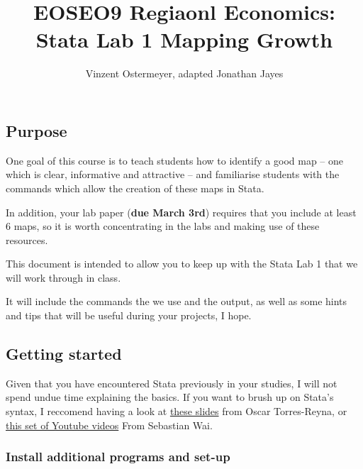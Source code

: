 \documentclass[
  letterpaper,
  DIV=11,
  numbers=noendperiod]{scrartcl}
\title{EOSEO9 Regiaonl Economics: Stata Lab 1 Mapping Growth}
\author{Vinzent Ostermeyer, adapted Jonathan Jayes}
\date{}
\renewcommand*\contentsname{Table of contents}
\newcommand\contentsname{Table of contents}
\begin{document}
\maketitle
\ifdefined\Shaded\renewenvironment{Shaded}{\begin{tcolorbox}[enhanced, interior hidden, borderline west={3pt}{0pt}{shadecolor}, boxrule=0pt, sharp corners, breakable, frame hidden]}{\end{tcolorbox}}\fi

\renewcommand*\contentsname{Table of contents}
{
\hypersetup{linkcolor=}
\setcounter{tocdepth}{3}
\tableofcontents
}
\hypertarget{purpose}{%
\subsection{Purpose}\label{purpose}}

One goal of this course is to teach students how to identify a good map
-- one which is clear, informative and attractive -- and familiarise
students with the commands which allow the creation of these maps in
Stata.

In addition, your lab paper (\textbf{due March 3rd}) requires that you
include at least 6 maps, so it is worth concentrating in the labs and
making use of these resources.

This document is intended to allow you to keep up with the Stata Lab 1
that we will work through in class.

It will include the commands the we use and the output, as well as some
hints and tips that will be useful during your projects, I hope.

\hypertarget{getting-started}{%
\subsection{Getting started}\label{getting-started}}

Given that you have encountered Stata previously in your studies, I will
not spend undue time explaining the basics. If you want to brush up on
Stata's syntax, I reccomend having a look at
\href{https://github.com/j-jayes/EOSE09/blob/b8444dd95783f4434ab63c4ad28b0f3033d4fd0a/resources/StataTutorial.pdf}{these
slides} from Oscar Torres-Reyna, or
\href{https://www.youtube.com/watch?v=oXsPgQe-aqs\&ab_channel=SebastianWaiEcon}{this
set of Youtube videos} From Sebastian Wai.

\hypertarget{install-additional-programs-and-set-up}{%
\subsubsection{Install additional programs and
set-up}\label{install-additional-programs-and-set-up}}
\end{document}
